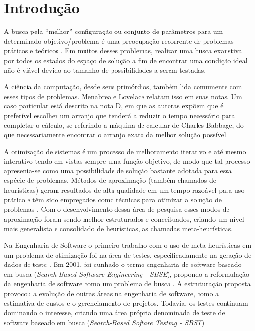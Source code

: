 \chapter[Introdução]{Introdução}

A busca pela ``melhor'' configuração ou conjunto de parâmetros para um determinado objetivo/problema é uma preocupação recorrente de problemas práticos e teóricos \cite{combinatorialoptimization1998}. Em muitos desses problemas, realizar uma busca exaustiva por todos os estados do espaço de solução a fim de encontrar uma condição ideal não é viável devido ao tamanho de possibilidades a serem testadas. 

A ciência da computação, desde seus primórdios, também lida comumente com esses tipos de problemas. Menabrea e Lovelace relatam isso em suas notas\cite{menabrea1842sketch}. Um caso particular está descrito na nota D, em que as autoras expõem que é preferível escolher um arranjo que tenderá a reduzir o tempo necessário para completar o cálculo, se referindo a
máquina de calcular de Charles Babbage, do que necessariamente encontrar o arranjo exato da melhor solução possível\cite{menabrea1842sketch}.

A otimização de sistemas é um processo de melhoramento iterativo e até mesmo interativo tendo em vistas sempre uma função objetivo, de modo que tal processo apresenta-se como uma possibilidade de solução bastante adotada para essa espécie de problemas. Métodos de aproximação (também chamados de heurísticas) geram resultados de alta qualidade em um tempo razoável para uso prático e têm sido empregados como técnicas para otimizar a solução de problemas \cite{gendreau2005metaheuristics}. Com o desenvolvimento dessa área de pesquisa esses modos de aproximação foram sendo melhor estruturados e conceituados, criando um nível mais generalista e consolidado de heurísticas, as chamadas meta-heurísticas.

Na Engenharia de Software o primeiro trabalho com o uso de meta-heurísticas em um problema de otimização foi na área de testes, especificadamente na geração de dados de teste \cite{miller1976automatic}. Em 2001, foi cunhado o termo engenharia de software baseado em busca (\textit{Search-Based Software Engineering - SBSE}), propondo a reformulação da engenharia de software como um problema de busca \cite{harman2001search}. A estruturação proposta provocou a evolução de outras áreas na engenharia de software, como a estimativa de custos e o gerenciamento de projetos. Todavia, os testes continuam dominando o interesse, criando uma área própria denominada de teste de software baseado em busca (\textit{Search-Based Softare Testing - SBST}) \cite{harman2012search}

